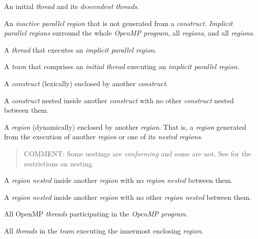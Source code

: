 \glossarydefstart
An initial \emph{thread} and its \emph{descendent threads}.
\glossarydefend

\glossarydefstart
An \emph{inactive parallel region} that is not generated from a
 \emph{construct}. \emph{Implicit parallel regions} surround the whole
\emph{OpenMP program}, all  \emph{regions}, and all 
\emph{regions}.

\glossarydefend

\glossarydefstart
A \emph{thread} that executes an \emph{implicit parallel region}.
\glossarydefend

\glossarydefstart
A \emph{team} that comprises an \emph{initial thread} executing an \emph{implicit parallel region}.
\glossarydefend

\glossarydefstart
A \emph{construct} (lexically) enclosed by another \emph{construct}.
\glossarydefend

\glossarydefstart
A \emph{construct} nested inside another \emph{construct} with no other \emph{construct} nested 
between them.
\glossarydefend

\glossarydefstart
A \emph{region} (dynamically) enclosed by another \emph{region}.  That is, a
\emph{region} generated from the execution of another \emph{region}
or one of its \emph{nested regions}.

\begin{quote}
COMMENT: Some nestings are \emph{conforming} and some are not. 
See  for the restrictions on nesting.
\end{quote}
\glossarydefend

\glossarydefstart
A \emph{region nested} inside another \emph{region} with no  \emph{region nested} between 
them. 
\glossarydefend

\glossarydefstart
A \emph{region nested} inside another \emph{region} with no other \emph{region nested} between 
them. 
\glossarydefend

\glossarydefstart
All OpenMP \emph{threads} participating in the \emph{OpenMP program}.
\glossarydefend

\glossarydefstart
All \emph{threads} in the \emph{team} executing the innermost enclosing  \emph{region}.
\glossarydefend

